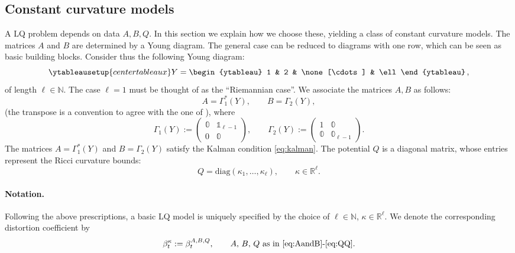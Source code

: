 \documentclass[11pt,a4paper]{article}
\theoremstyle{plain}
\theoremstyle{definition}
\theoremstyle{remark}
\numberwithin{equation}{section}
\newcommand{\R}{\mathbb{R}} %
\newcommand{\N}{\mathbb{N}} %
\begin{document}
\subsection{Constant curvature models}\label{sec:constcurvmodels}

A LQ problem depends on data $A,B,Q$. In this section we explain how we choose these, yielding a class of constant curvature models. The matrices $A$ and $B$ are determined by a Young diagram. The general case can be reduced to diagrams with one row, which can be seen as basic building blocks. Consider thus the following Young diagram:
\begin{equation}
\ytableausetup{centertableaux}
Y = \begin{ytableau}
1 & 2 & \none[\cdots] & \ell
\end{ytableau}\,,
\end{equation}
of length $\ell\in \N$. The case $\ell=1$ must be thought of as the ``Riemannian case''. We associate the matrices $A,B$ as follows:
\begin{equation}\label{eq:AandB}
A = \Gamma_1^*(Y), \qquad B = \Gamma_2(Y),
\end{equation}
(the transpose is a convention to agree with the one of \cite{BR-comparison}), where
\begin{equation}\label{eq:Gamma}
\Gamma_1(Y) := \begin{pmatrix}
\mathbb{0} & \mathbb{1}_{\ell-1} \\
0 & \mathbb{0}
\end{pmatrix} , 
\qquad \Gamma_2(Y) := \begin{pmatrix}
1 & \mathbb{0} \\
\mathbb{0} & \mathbb{0}_{\ell-1}
\end{pmatrix}.
\end{equation}
The matrices $A=\Gamma_{1}^*(Y)$ and $B=\Gamma_{2}(Y)$ satisfy the Kalman condition \eqref{eq:kalman}. The potential $Q$ is a diagonal matrix, whose entries represent the Ricci curvature bounds: 
\begin{equation}\label{eq:QQ}
Q = \mathrm{diag}(\kappa_1,\dots,\kappa_\ell), \qquad \kappa \in \R^\ell.
\end{equation}
\paragraph*{Notation.} Following the above prescriptions, a basic LQ model is uniquely specified by the choice of $\ell\in \N$, $\kappa \in \R^\ell$. We denote the corresponding distortion coefficient by
\begin{equation}
\beta_t^\kappa:=\beta_t^{A,B,Q}, \qquad \text{$A$, $B$, $Q$ as in \eqref{eq:AandB}-\eqref{eq:QQ}}.
\end{equation}
\end{document}
